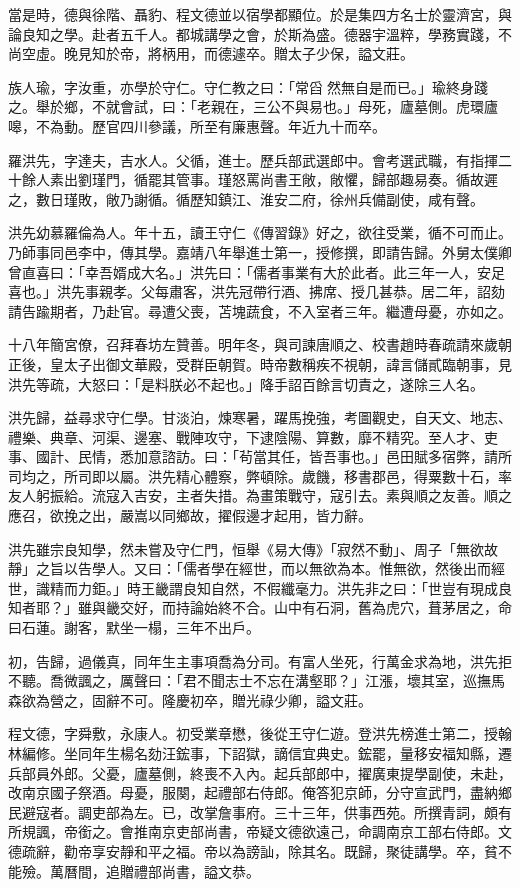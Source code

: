 \begin{pinyinscope}
當是時，德與徐階、聶豹、程文德並以宿學都顯位。於是集四方名士於靈濟宮，與論良知之學。赴者五千人。都城講學之會，於斯為盛。德器宇溫粹，學務實踐，不尚空虛。晚見知於帝，將柄用，而德遽卒。贈太子少保，謚文莊。

族人瑜，字汝重，亦學於守仁。守仁教之曰：「常舀然無自是而已。」瑜終身踐之。舉於鄉，不就會試，曰：「老親在，三公不與易也。」母死，廬墓側。虎環廬嗥，不為動。歷官四川參議，所至有廉惠聲。年近九十而卒。

羅洪先，字達夫，吉水人。父循，進士。歷兵部武選郎中。會考選武職，有指揮二十餘人素出劉瑾門，循罷其管事。瑾怒罵尚書王敞，敞懼，歸部趣易奏。循故遲之，數日瑾敗，敞乃謝循。循歷知鎮江、淮安二府，徐州兵備副使，咸有聲。

洪先幼慕羅倫為人。年十五，讀王守仁《傳習錄》好之，欲往受業，循不可而止。乃師事同邑李中，傳其學。嘉靖八年舉進士第一，授修撰，即請告歸。外舅太僕卿曾直喜曰：「幸吾婿成大名。」洪先曰：「儒者事業有大於此者。此三年一人，安足喜也。」洪先事親孝。父每肅客，洪先冠帶行酒、拂席、授几甚恭。居二年，詔劾請告踰期者，乃赴官。尋遭父喪，苫塊蔬食，不入室者三年。繼遭母憂，亦如之。

十八年簡宮僚，召拜春坊左贊善。明年冬，與司諫唐順之、校書趙時春疏請來歲朝正後，皇太子出御文華殿，受群臣朝賀。時帝數稱疾不視朝，諱言儲貳臨朝事，見洪先等疏，大怒曰：「是料朕必不起也。」降手詔百餘言切責之，遂除三人名。

洪先歸，益尋求守仁學。甘淡泊，煉寒暑，躍馬挽強，考圖觀史，自天文、地志、禮樂、典章、河渠、邊塞、戰陣攻守，下逮陰陽、算數，靡不精究。至人才、吏事、國計、民情，悉加意諮訪。曰：「茍當其任，皆吾事也。」邑田賦多宿弊，請所司均之，所司即以屬。洪先精心體察，弊頓除。歲饑，移書郡邑，得粟數十石，率友人躬振給。流寇入吉安，主者失措。為畫策戰守，寇引去。素與順之友善。順之應召，欲挽之出，嚴嵩以同鄉故，擢假邊才起用，皆力辭。

洪先雖宗良知學，然未嘗及守仁門，恒舉《易大傳》「寂然不動」、周子「無欲故靜」之旨以告學人。又曰：「儒者學在經世，而以無欲為本。惟無欲，然後出而經世，識精而力鉅。」時王畿謂良知自然，不假纖毫力。洪先非之曰：「世豈有現成良知者耶？」雖與畿交好，而持論始終不合。山中有石洞，舊為虎穴，葺茅居之，命曰石蓮。謝客，默坐一榻，三年不出戶。

初，告歸，過儀真，同年生主事項喬為分司。有富人坐死，行萬金求為地，洪先拒不聽。喬微諷之，厲聲曰：「君不聞志士不忘在溝壑耶？」江漲，壞其室，巡撫馬森欲為營之，固辭不可。隆慶初卒，贈光祿少卿，謚文莊。

程文德，字舜敷，永康人。初受業章懋，後從王守仁遊。登洪先榜進士第二，授翰林編修。坐同年生楊名劾汪鋐事，下詔獄，謫信宜典史。鋐罷，量移安福知縣，遷兵部員外郎。父憂，廬墓側，終喪不入內。起兵部郎中，擢廣東提學副使，未赴，改南京國子祭酒。母憂，服闋，起禮部右侍郎。俺答犯京師，分守宣武門，盡納鄉民避寇者。調吏部為左。已，改掌詹事府。三十三年，供事西苑。所撰青詞，頗有所規諷，帝銜之。會推南京吏部尚書，帝疑文德欲遠己，命調南京工部右侍郎。文德疏辭，勸帝享安靜和平之福。帝以為謗訕，除其名。既歸，聚徒講學。卒，貧不能殮。萬曆間，追贈禮部尚書，謚文恭。


\end{pinyinscope}
